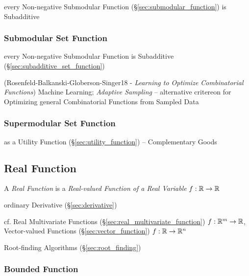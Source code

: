 every Non-negative Submodular Function (\S\ref{sec:submodular_function}) is
Subadditive



\subsubsection{Submodular Set Function}\label{sec:submodular_set_function}

every Non-negative Submodular Function is Subadditive
(\S\ref{sec:subadditive_set_function})

(Rosenfeld-Balkanski-Globerson-Singer18 - \emph{Learning to Optimize
  Combinatorial Functions}) Machine Learning; \emph{Adaptive Sampling} --
alternative critereon for Optimizing general Combinatorial Functions from
Sampled Data



\subsubsection{Supermodular Set Function}\label{sec:submodular_set_function}

as a Utility Function (\S\ref{sec:utility_function}) -- Complementary Goods



\subsection{Real Function}\label{sec:real_function}

A \emph{Real Function} is a \emph{Real-valued Function of a Real Variable}
$f : \mathbb{R} \rightarrow \mathbb{R}$

ordinary Derivative (\S\ref{sec:derivative})

\fist cf. Real Multivariate Functions (\S\ref{sec:real_multivariate_function})
$f : \mathbb{R}^m \rightarrow \mathbb{R}$,
Vector-valued Functions (\S\ref{sec:vector_function}) $f : \mathbb{R} \rightarrow
\mathbb{R}^n$

\fist Root-finding Algorithms (\S\ref{sec:root_finding})



\subsubsection{Bounded Function}\label{sec:bounded_function}

